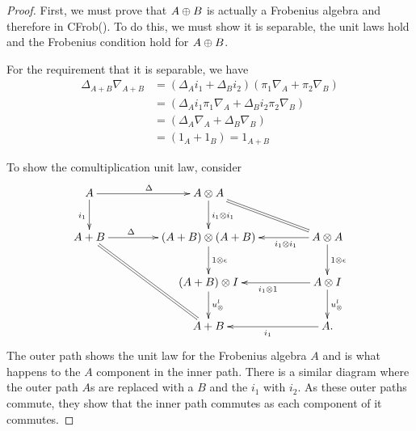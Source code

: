 \begin{proof}

  First, we must prove that $A\oplus B$ is actually a Frobenius algebra and therefore in CFrob(\X).
  To do this, we must show it is separable, the unit laws hold and the Frobenius condition hold for $A\oplus B$.

  For the requirement that it is separable, we have
  \begin{align*}
    \Delta_{A+B}\nabla_{A+B}&= (\Delta_A i_1 + \Delta_B i_2) (\pi_1 \nabla_A + \pi_2 \nabla_B)\\
    &=  (\Delta_A i_1 \pi_1 \nabla_A + \Delta_B i_2\pi_2 \nabla_B)\\
    &=  (\Delta_A \nabla_A + \Delta_B \nabla_B)\\
    &=  (1_A + 1_B) = 1_{A+B}
  \end{align*}


  To show the comultiplication unit law, consider
  \[
     \xymatrix@C+20pt{
       A \ar[r]^{\Delta} \ar[d]_{i_1} & A\*A \ar[d]^{i_1\*i_1} \ar@{=}[dr] \\
       A+B \ar[r]^(.35){\Delta} \ar@{=}[ddr] &(A+B)\*(A+B) \ar[d]^{1\*\epsilon}
          & A\*A \ar[l]^(.35){i_1\*i_1}  \ar[d]^{1\*\epsilon}\\
       & (A+B)\*I \ar[d]^{\usl} & A\*I \ar[d]^{\usl} \ar[l]^{i_1\*1}\\
       & A+B & A. \ar[l]^{i_1}
     }
  \]
  The outer path shows the unit law for the Frobenius algebra $A$ and is what happens to the $A$
  component in the inner path. There is a similar diagram where the outer path $A$s are replaced
  with a $B$ and the $i_1$ with $i_2$. As these outer paths commute, they show that the inner path
  commutes as each component of it commutes.


\end{proof}
